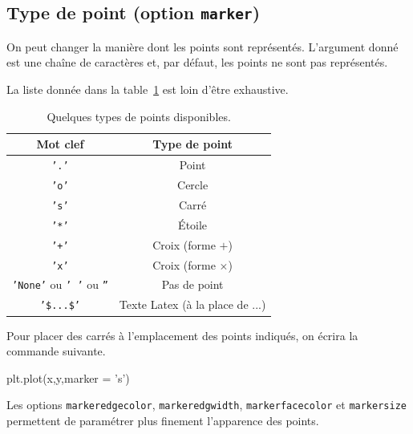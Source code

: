 \subsection{Type de point (option \texttt{marker})}

On peut changer la manière dont les points sont représentés. 
L'argument donné est une chaîne de caractères et, par défaut, les points ne sont pas représentés. 

\begin{rem}
  La liste donnée dans la table~\ref{tab:marker} est loin d'être exhaustive. 
\end{rem}


\begin{table}[!h]
  \begin{center}
    \begin{tabular}{|c|c|}
      \hline
      Mot clef & Type de point \\
      \hline
      \texttt{'.'} & Point \\
      \hline
      \texttt{'o'} & Cercle \\
      \hline
      \texttt{'s'} & Carré \\
      \hline
      \texttt{'*'} & Étoile \\
      \hline
      \texttt{'+'} & Croix (forme $+$) \\
      \hline
      \texttt{'x'} & Croix (forme $\times$) \\
      \hline
      \texttt{'None'} ou \texttt{' '} ou \texttt{''} & Pas de point \\
      \hline
      \texttt{'\$...\$'} & Texte Latex (à la place de ...) \\
      \hline
    \end{tabular}
    \caption{Quelques types de points disponibles.}
    \label{tab:marker}
  \end{center}
\end{table}

\begin{ex}
  Pour placer des carrés à l'emplacement des points indiqués, on écrira la commande suivante.
\begin{pyverbatim}
plt.plot(x,y,marker = 's')
\end{pyverbatim}
\end{ex}

\begin{rem}
  Les options \texttt{markeredgecolor}, \texttt{markeredgwidth}, \texttt{markerfacecolor} et \texttt{markersize} permettent de paramétrer plus finement l'apparence des points. 
\end{rem}

